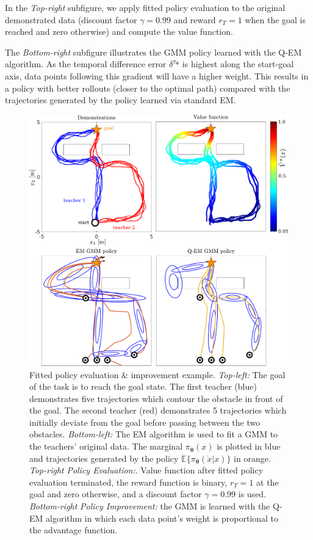 \documentclass[final,5p,times,twocolumn]{elsarticle}
\newcommand{\X}{x}
\newcommand{\U}{\dot{x}}
\newcommand{\Param}{\boldsymbol{\theta}}
\begin{document}
In the \textit{Top-right} subfigure, we apply fitted policy evaluation to the original demonstrated data (discount 
factor $\gamma=0.99$ and reward $r_{T}=1$ when the goal is reached and zero otherwise) and compute the value function.

The \textit{Bottom-right} subfigure illustrates the GMM policy learned with the Q-EM algorithm. As 
the temporal difference error $\delta^{\pi_{\Param}}$ is highest along the start-goal axis, data points
following this gradient will have a higher weight. This results in a policy with better 
rollouts (closer to the optimal path) compared with the trajectories generated by the policy learned via standard EM. 

\begin{figure}
 \centering
 \setlength\fboxsep{0pt}
  \setlength\fboxrule{0.25pt}
  \includegraphics[width=\linewidth]{./Figure/fpe_example.pdf}
 \caption{Fitted policy evaluation \& improvement example. 
  \textit{Top-left:} The goal of the task is to reach the goal state. The first teacher (blue) demonstrates 
  five trajectories which contour the obstacle in front of the goal. The second teacher (red) demonstrates 
  5 trajectories which initially deviate from the goal before passing between the two obstacles. 
  \textit{Bottom-left:} The EM algorithm is used to fit a GMM to the teachers' original data. 
  The marginal $\pi_{\Param}(\X)$ is plotted in blue and trajectories generated by the 
  policy $\mathbb{E}\{\pi_{\Param}(\U|\X)\}$ in orange. \textit{Top-right} \textit{Policy Evaluation:}.  
  Value function after fitted policy evaluation terminated, the reward function 
  is binary, $r_T=1$ at the goal and zero otherwise, and a discount factor $\gamma = 0.99$ is used.
  \textit{Bottom-right} \textit{Policy Improvement:} the GMM is learned with the Q-EM algorithm in which 
  each data point's weight is proportional to the advantage function.
 }
  \label{fig:fpe_example}
\end{figure}
\end{document}
